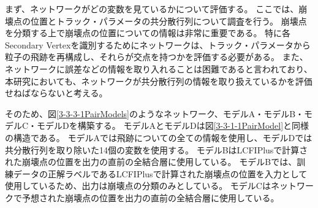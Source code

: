 まず、ネットワークがどの変数を見ているかについて評価する。
ここでは、崩壊点の位置とトラック・パラメータの共分散行列について調査を行う。
崩壊点を分類する上で崩壊点の位置についての情報は非常に重要である。
特に各Secondary Vertexを識別するためにネットワークは、トラック・パラメータから粒子の飛跡を再構成し、それらが交点を持つかを評価する必要がある。
また、ネットワークに誤差などの情報を取り入れることは困難であると言われており、本研究においても、ネットワークが共分散行列の情報を取り扱えているかを評価せねばならないと考える。

そのため、図\ref{3-3-3-1PairModels}のようなネットワーク、モデルA・モデルB・モデルC・モデルDを構築する。
モデルAとモデルDは図\ref{3-3-1-1PairModel}と同様の構造である。
モデルAでは飛跡についての全ての情報を使用し、モデルDでは共分散行列を取り除いた14個の変数を使用する。
モデルBはLCFIPlusで計算された崩壊点の位置を出力の直前の全結合層に使用している。
モデルBでは、訓練データの正解ラベルであるLCFIPlusで計算された崩壊点の位置を入力として使用しているため、出力は崩壊点の分類のみとしている。
モデルCはネットワークで予想された崩壊点の位置を出力の直前の全結合層に使用している。

